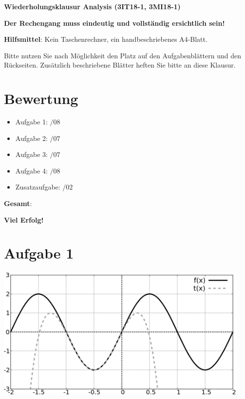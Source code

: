 \documentclass[12pt]{article}
\begin{document}
\thispagestyle{firstpage}

\begin{center}
{\bf {\large Wiederholungsklausur Analysis (3IT18-1, 3MI18-1)}}
\end{center}

\begin{center}
\textbf {Der Rechengang muss eindeutig und vollständig ersichtlich sein!}
\end{center}

\textbf{Hilfsmittel}: Kein Taschenrechner, ein handbeschriebenes A4-Blatt.

\begin{center}
Bitte nutzen Sie nach Möglichkeit den Platz auf den Aufgabenblättern und den Rückseiten. Zusätzlich beschriebene Blätter heften Sie bitte an diese Klausur.
\end{center}

\section*{Bewertung}

\begin{itemize}
\item Aufgabe 1:      \space\space\space\space\space$/08$
\item Aufgabe 2:      \space\space\space\space\space$/07$
\item Aufgabe 3:      \space\space\space\space\space$/07$
\item Aufgabe 4:      \space\space\space\space\space$/08$
\item Zusatzaufgabe:  \space\space\space\space\space$/02$
\end{itemize}

\textbf{Gesamt}: \space\space\space\space\space %

\begin{center}
{\bf {\large Viel Erfolg!}}
\end{center}

\newpage
\section* {Aufgabe 1}

\begin{center}
\includegraphics[width=0.95\textwidth]{grid_klausur.png}
\end{center}
\end{document}
